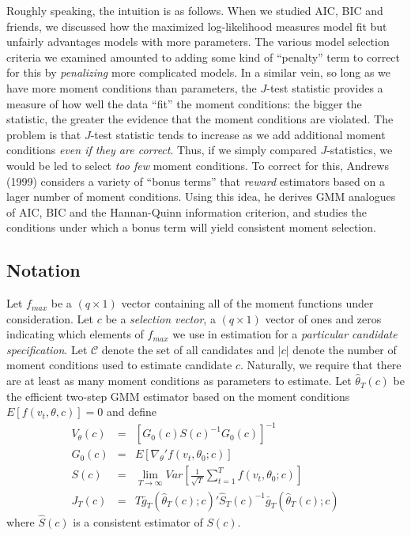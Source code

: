 \documentclass[12pt]{article}
\theoremstyle{definition}
\begin{document}
Roughly speaking, the intuition is as follows. When we studied AIC, BIC and friends, we discussed how the maximized log-likelihood measures model fit but unfairly advantages models with more parameters. The various model selection criteria we examined amounted to adding some kind of ``penalty'' term to correct for this by \emph{penalizing} more complicated models. In a similar vein, so long as we have more moment conditions than parameters, the $J$-test statistic provides a measure of how well the data ``fit'' the moment conditions: the bigger the statistic, the greater the evidence that the moment conditions are violated. The problem is that $J$-test statistic tends to increase as we add additional moment conditions \emph{even if they are correct}. Thus, if we simply compared $J$-statistics, we would be led to select \emph{too few} moment conditions. To correct for this, Andrews (1999) considers a variety of ``bonus terms'' that \emph{reward} estimators based on a lager number of moment conditions. Using this idea, he derives GMM analogues of AIC, BIC and the Hannan-Quinn information criterion, and studies the conditions under which a bonus term will yield consistent moment selection.

\subsection{Notation}
Let $f_{max}$ be a $(q\times 1)$ vector containing all of the moment functions under consideration. Let $c$ be a \emph{selection vector}, a $(q\times 1)$ vector of ones and zeros indicating which elements of $f_{max}$ we use in estimation for a \emph{particular candidate specification}. Let $\mathcal{C}$ denote the set of all candidates and $|c|$ denote the number of moment conditions used to estimate candidate $c$. Naturally, we require that there are at least as many moment conditions as parameters to estimate. Let $\widehat{\theta}_T(c)$ be the efficient two-step GMM estimator based on the moment conditions $E[f(v_t,\theta, c)]=0$ and define
\begin{eqnarray*}
 	V_\theta(c) &=& \left[G_0(c) S(c)^{-1} G_0(c) \right]^{-1}\\
 	G_0(c) &=& E[\nabla_\theta' f(v_t, \theta_0; c)]\\
 	S(c) &=& \lim_{T\rightarrow\infty} Var\left[\frac{1}{\sqrt{T}}\sum_{t=1}^T f(v_t, \theta_0;c)\right]\\
 	J_T(c) &=& T \bar{g}_T\left(\widehat{\theta}_T(c);c\right)'\widehat{S}_T(c)^{-1}\bar{g}_T\left(\widehat{\theta}_T(c);c\right)
 \end{eqnarray*}
where $\widehat{S}(c)$ is a consistent estimator of $S(c)$.
\end{document}
